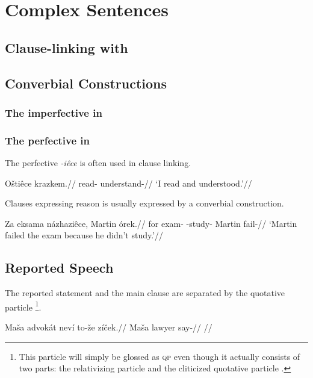 \chapter{Complex Sentences}

\section{Clause-linking with }

\section{Converbial Constructions}\label{converbs-syntax}

\subsection{The imperfective in }



\subsection{The perfective in }

The perfective \textit{-iêce} is often used in clause linking.

\pex
\begingl
\gla O\v{s}tiêce krazkem.//
\glb read- understand-//
\glft `I read and understood.'//
\endgl
\xe

Clauses expressing reason is usually expressed by a converbial construction.

\pex
\begingl
\gla Za eksama názhaziêce, Martin órek.//
\glb for exam- -study- Martin fail-//
\glft `Martin failed the exam because he didn't study.'//
\endgl
\xe

\section{Reported Speech}\label{sec:reportedspeech}

The reported statement and the main clause are separated by the quotative particle \footnote{This particle will simply be glossed as {\scshape qp} even though it actually consists of two parts: the relativizing particle  and the cliticized quotative particle .}.

\pex
\begingl
\gla Ma\v{s}a advok\'at nev\'i to-\v{z}e z\'i\v{c}ek.//
\glb Ma\v{s}a lawyer   say-//
\glft {}//
\endgl
\xe

